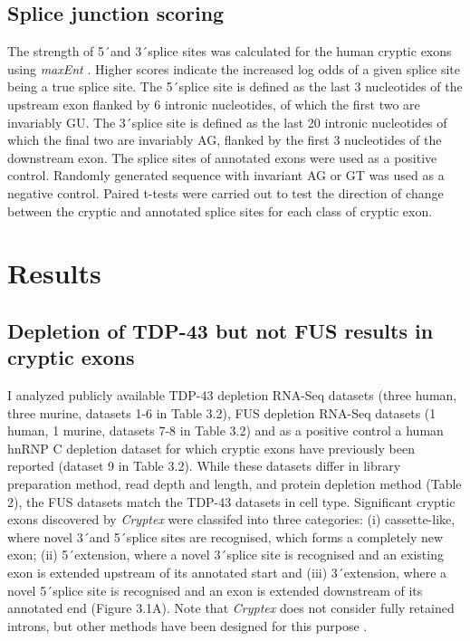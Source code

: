 \subsection{Splice junction scoring }
The strength of 5\'\ and 3\'\ splice sites was calculated for the human cryptic exons using \emph{maxEnt} \citep{Yeo2004-pz}. Higher scores indicate the increased log odds of a given splice site being a true splice site. The 5\'\ splice site is defined as the last 3 nucleotides of the upstream exon flanked by 6 intronic nucleotides, of which the first two are invariably GU. The 3\'\ splice site is defined as the last 20 intronic nucleotides of which the final two are invariably AG, flanked by the first 3 nucleotides of the downstream exon. The splice sites of annotated exons were used as a positive control. Randomly generated sequence with invariant AG or GT was used as a negative control. Paired t-tests were carried out to test the direction of change between the cryptic and annotated splice sites for each class of cryptic exon.


\section{Results}
\subsection{Depletion of TDP-43 but not FUS results in cryptic exons}
I analyzed publicly available TDP-43 depletion RNA-Seq datasets (three human, three murine, datasets 1-6 in Table 3.2), FUS depletion RNA-Seq datasets (1 human, 1 murine, datasets 7-8 in Table 3.2) and as a positive control a human hnRNP C depletion dataset for which cryptic exons have previously been reported (dataset 9 in Table 3.2).  While these datasets differ in library preparation method, read depth and length, and protein depletion method (Table 2), the FUS datasets match the TDP-43 datasets in cell type. 
Significant cryptic exons discovered by \textit{Cryptex} were classifed into three categories: (i) cassette-like, where novel 3\'\ and 5\'\ splice sites are recognised, which forms a completely new exon; (ii) 5\'\ extension, where a novel 3\'\ splice site is recognised and an existing exon is extended upstream of its annotated start and (iii) 3\'\ extension, where a novel 5\'\ splice site is recognised and an exon is extended downstream of its annotated end (Figure 3.1A). Note that \textit{Cryptex} does not consider fully retained introns, but other methods have been designed for this purpose \citep{Li2015-en,Bai2015-aq}.

